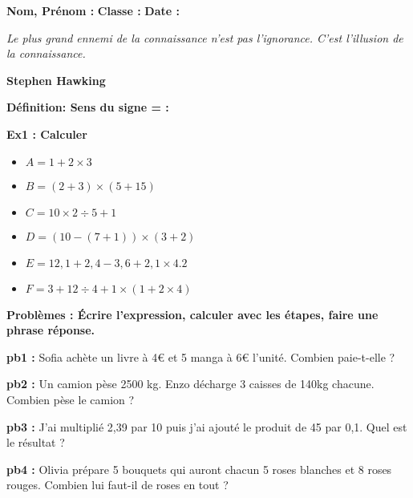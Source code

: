 



\textbf{Nom, Prénom :} \hspace{8cm} \textbf{Classe :} \hspace{3cm} \textbf{Date :}\\

\begin{center}
  \textit{Le plus grand ennemi de la connaissance n'est pas l'ignorance. C'est l'illusion de la connaissance.} 
  
  \textbf{Stephen Hawking}
\end{center}

\textbf{Définition: Sens du signe = :} \\ \Pointilles[1]

\textbf{Ex1 : Calculer}

\begin{multicols}{3}\begin{itemize}[label={$\bullet$}]
  \item $A = 1 + 2 \times 3$ 
  \item $B = (2+3) \times (5+15)$
  \item $C = 10 \times 2 \div 5 + 1$
  \item $D = (10 - (7 + 1)) \times (3 + 2)$
  \item $E = 12,1 + 2,4 - 3,6 + 2,1 \times 4.2$
  \item $F = 3 + 12 \div 4 + 1 \times (1 + 2 \times 4)$
\end{itemize}\end{multicols}

\Pointilles[20]

\textbf{Problèmes : Écrire l'expression, calculer avec les étapes, faire une phrase réponse.}

\begin{multicols}{2}

\textbf{pb1 : }
Sofia achète un livre à 4€ et 5 manga à 6€ l'unité. Combien paie-t-elle ?  \\ \Pointilles[5]

\textbf{pb2 : }
Un camion pèse 2500 kg. Enzo décharge 3 caisses de 140kg chacune. Combien pèse le camion ? \\ \Pointilles[5] \columnbreak

\textbf{pb3 : }
\og J'ai multiplié 2,39 par 10 puis j'ai ajouté le produit de 45 par 0,1. \fg 
Quel est le résultat ? \\ \Pointilles[5]

\textbf{pb4 : }
Olivia prépare 5 bouquets qui auront chacun 5 roses blanches et 8 roses rouges. Combien lui faut-il de roses en tout ? \\ \Pointilles[5]

\end{multicols}


